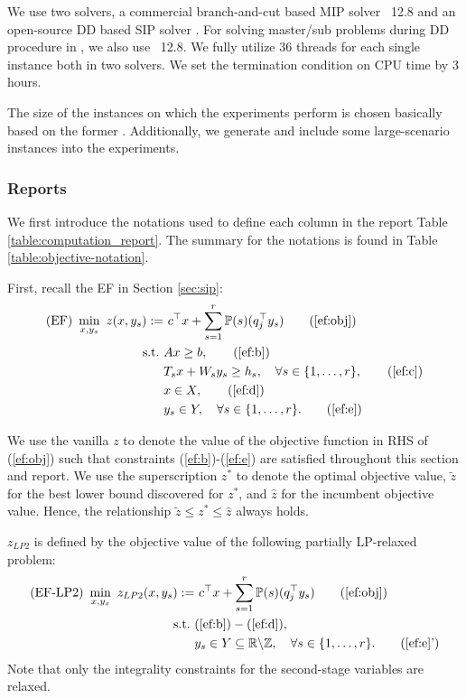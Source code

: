 We use two solvers, a commercial branch-and-cut based MIP solver \cplex\ 12.8 and an open-source DD based SIP solver \dsp. For solving master/sub problems during DD procedure in \dsp, we also use \cplex\ 12.8. We fully utilize 36 threads for each single instance both in two solvers. We set the termination condition on CPU time by 3 hours.  

The size of the instances on which the experiments perform is chosen basically based on the former \siplib. Additionally, we generate and include some large-scenario instances into the experiments.

\subsubsection{Reports}
We first introduce the notations used to define each column in the report Table \ref{table:computation_report}. The summary for the notations is found in Table \ref{table:objective-notation}.

First, recall the EF in Section \ref{sec:sip}:
\begin{subequations}\label{ef}
	\begin{align}
	\textrm{(EF) }\min_{x,y_s}\ z(x,y_s):=&\ c^{\top}x + \sum_{s=1}^{r}\PP(s) (q_j^{\top}y_s) \tag{\ref{ef:obj}}\\ 
	\mathrm{s.t.}\ &Ax\ge b,  \tag{\ref{ef:b}}\\
	&T_s x+W_s y_s\ge h_s,\quad\forall s\in\{1,\ldots,r\}, \tag{\ref{ef:c}} \\
	&x\in X, \tag{\ref{ef:d}} \\
	&y_s \in Y,\quad\forall s\in\{1,\ldots,r\}. \tag{\ref{ef:e}}
	\end{align}
\end{subequations}

We use the vanilla $z$ to denote the value of the objective function in RHS of (\ref{ef:obj}) such that constraints (\ref{ef:b})-(\ref{ef:e}) are satisfied throughout this section and report. We use the superscription $z^*$ to denote the optimal objective value, $\tilde{z}$ for the best lower bound discovered for $z^*$, and $\hat{z}$ for the incumbent objective value. Hence, the relationship $\tilde{z}\le z^*\le\hat{z}$ always holds.

$z_{LP2}$ is defined by the objective value of the following partially LP-relaxed problem:
\begin{subequations}\label{ef-lp2}
	\begin{align}
	\textrm{(EF-LP2) }\min_{x,y_s}\ z_{LP2}(x,y_s):=&\ c^{\top}x + \sum_{s=1}^{r}\PP(s) (q_j^{\top}y_s) \tag{\ref{ef:obj}}\\ 
	\mathrm{s.t.}\ &\textrm{(\ref{ef:b})}-\textrm{(\ref{ef:d})}, \nonumber \\
	& y_s \in Y \subseteq \mathbb{R}\backslash\mathbb{Z} ,\quad\forall s\in\{1,\ldots,r\}. \tag{\ref{ef:e}'}
	\end{align}
\end{subequations}
Note that only the integrality constraints for the second-stage variables are relaxed.


